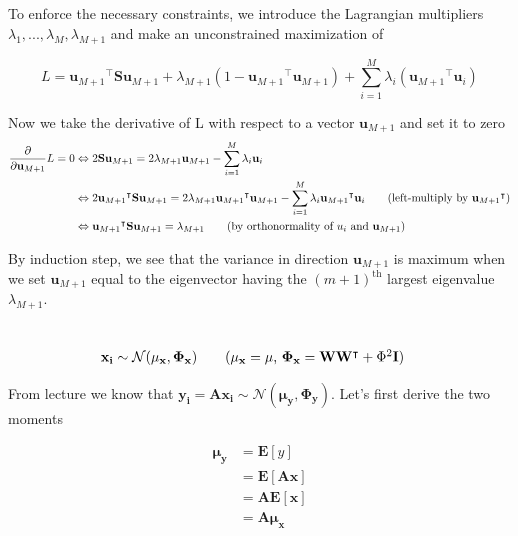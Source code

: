 \documentclass[11pt]{article}
\newcommand{\exercise}{\section{}}
\newcommand{\sumf}[3]{\sum_{#1}^{#2} #3}
\newcommand{\tf}[1]{{#1}^{\intercal}}
\newcommand{\partialf}[1]{\frac{\partial}{{\partial #1}}}
\begin{document}
\exercise

To enforce the necessary constraints, we introduce the Lagrangian multipliers $\lambda_{1}, ..., \lambda_{M}, \lambda_{M+1}$ and make an unconstrained maximization of 

$$L = \tf{\mathbf{u}_{M+1}} \mathbf{S} \mathbf{u}_{M+1}  + \lambda_{M+1}(1 - \tf{\mathbf{u}_{M+1}} \mathbf{u}_{M+1}) + \sumf{i=1}{M}{\lambda_i (\tf{\mathbf{u}_{M+1}} \mathbf{u}_{i} )}$$

\noindent Now we take the derivative of L with respect to a vector $\mathbf{u}_{M+1}$ and set it to zero
\begin{align*}
\partialf{\mathbf{u}_{M+1}} L = 0 &\Leftrightarrow 2 \mathbf{S} \mathbf{u}_{M+1} = 2 \lambda_{M+1} \mathbf{u}_{M+1} - \sumf{i=1}{M}{\lambda_i \mathbf{u}_{i}} \\
&\Leftrightarrow 2 \tf{\mathbf{u}_{M+1}} \mathbf{S} \mathbf{u}_{M+1} = 2 \lambda_{M+1} \tf{\mathbf{u}_{M+1}} \mathbf{u}_{M+1} - \sumf{i=1}{M}{\lambda_i \tf{\mathbf{u}_{M+1}} \mathbf{u}_{i}} \tag{left-multiply by $\tf{\mathbf{u}_{M+1}}$} \\
&\Leftrightarrow \tf{\mathbf{u}_{M+1}} \mathbf{S} \mathbf{u}_{M+1} = \lambda_{M+1} \tag{by orthonormality of $u_i$ and $\mathbf{u}_{M+1}$} \\
\end{align*}

\noindent  By induction step, we see that the variance in direction $\mathbf{u}_{M+1}$  is maximum when we set $\mathbf{u}_{M+1}$ equal to the eigenvector having the $(m+1)^{\text{th}}$ largest eigenvalue $\lambda_{M+1}$.

\exercise

\begin{align*}
\mathbf{x_i} &\sim \mathcal{N}(\mathbf{\mu_x}, \mathbf{\Phi_x}) \tag{$\mathbf{\mu_x} = \mathbf{\mu}$, $\mathbf{\Phi_x} = \mathbf{W} \tf{\mathbf{W}} + \Phi^2 \mathbf{I}$}
\end{align*}

\noindent From lecture we know that $\mathbf{y_i} = \mathbf{A} \mathbf{x_i} \sim \mathcal{N}(\mathbf{\mu_y}, \mathbf{\Phi_y}) $. Let's first derive the two moments

\begin{align*}
\mathbf{\mu_y} &= \mathbf{E}[y] \\
&= \mathbf{E}[\mathbf{A} \mathbf{x}] \\
&= \mathbf{A} \mathbf{E}[\mathbf{x}] \\
&= \mathbf{A} \mathbf{\mu_x}
\end{align*}
\end{document}
